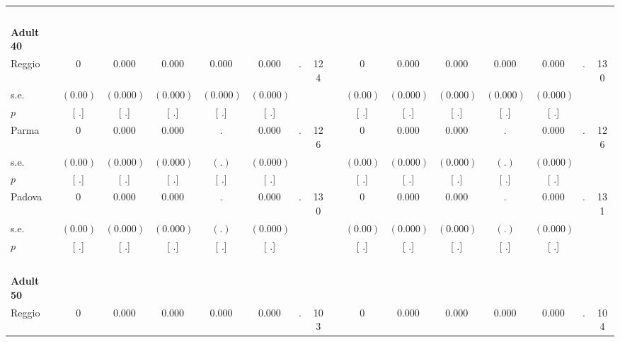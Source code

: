 \begin{longtable}{L{8em} c c c c c c c p{1em} c c c c c c c}
~\\[1em]
\quad \quad \textbf{Adult 40} & & & & & & & & & & & & & & & \\* 
\quad \quad \quad Reggio& 0 &     0.000 &     0.000 &     0.000 &     0.000 &         . &       124 & & 0 &     0.000 &     0.000 &     0.000 &     0.000 &         . &       130  \\*
\quad \quad \quad \quad s.e.& $ (     0.00)$ & $ (    0.000)$ & $ (    0.000)$ & $ (    0.000)$ & $ (    0.000)$ & & & & $ (     0.00)$ & $ (    0.000)$ & $ (    0.000)$ & $ (    0.000)$ & $ (    0.000)$ & &  \\*
\quad \quad \quad \quad $ p$ & [        .] & [        .] & [        .] & [        .] & [        .] & & & & [        .] & [        .] & [        .] & [        .] & [        .] & &  \\[1em]
\quad \quad \quad Parma& 0 &     0.000 &     0.000 &         . &     0.000 &         . &       126 & & 0 &     0.000 &     0.000 &         . &     0.000 &         . &       126  \\*
\quad \quad \quad \quad s.e.& $ (     0.00)$ & $ (    0.000)$ & $ (    0.000)$ & $ (        .)$ & $ (    0.000)$ & & & & $ (     0.00)$ & $ (    0.000)$ & $ (    0.000)$ & $ (        .)$ & $ (    0.000)$ & &  \\*
\quad \quad \quad \quad $ p$ & [        .] & [        .] & [        .] & [        .] & [        .] & & & & [        .] & [        .] & [        .] & [        .] & [        .] & &  \\[1em]
\quad \quad \quad Padova& 0 &     0.000 &     0.000 &         . &     0.000 &         . &       130 & & 0 &     0.000 &     0.000 &         . &     0.000 &         . &       131  \\*
\quad \quad \quad \quad s.e.& $ (     0.00)$ & $ (    0.000)$ & $ (    0.000)$ & $ (        .)$ & $ (    0.000)$ & & & & $ (     0.00)$ & $ (    0.000)$ & $ (    0.000)$ & $ (        .)$ & $ (    0.000)$ & &  \\*
\quad \quad \quad \quad $ p$ & [        .] & [        .] & [        .] & [        .] & [        .] & & & & [        .] & [        .] & [        .] & [        .] & [        .] & &  \\[1em]
~\\[1em]
\quad \quad \textbf{Adult 50} & & & & & & & & & & & & & & & \\* 
\quad \quad \quad Reggio& 0 &     0.000 &     0.000 &     0.000 &     0.000 &         . &       103 & & 0 &     0.000 &     0.000 &     0.000 &     0.000 &         . &       104  \\*

\end{longtable}
